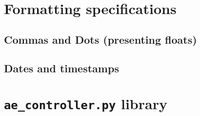 \documentclass{article}
\begin{document}

\section{Formatting specifications}
\subsection{Commas and Dots (presenting floats)}


\subsection{Dates and timestamps}


\section{\texttt{ae\_controller.py} library}
\end{document}
